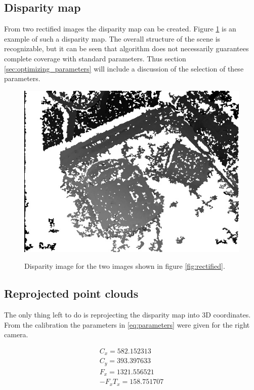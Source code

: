 \subsection{Disparity map}

From two rectified images the disparity map can be created. Figure \ref{fig:disparity} is an example of such a disparity map. The overall structure of the scene is recognizable, but it can be seen that algorithm does not necessarily guarantees complete coverage with standard parameters. Thus section \ref{sec:optimizing_parameters} will include a discussion of the selection of these parameters.

\begin{figure}[h!]
  \caption{Disparity image for the two images shown in figure \ref{fig:rectified}. }
  \centering
    \includegraphics[scale=0.4]{graphics/06_vision/disparity_example.jpg}
    \label{fig:disparity}
\end{figure}


\subsection{Reprojected point clouds} \label{sec:repro_point}

The only thing left to do is reprojecting the disparity map into 3D coordinates. From the calibration the parameters in \ref{eq:parameters} were given for the right camera.

\begin{equation}\label{eq:parameters}
\begin{split}
C_{x} = 582.152313 \\
C_{y} = 393.397633 \\
F_{x} = 1321.556521 \\
-F_{x}T_{x} = 158.751707 
\end{split}
\end{equation} 


